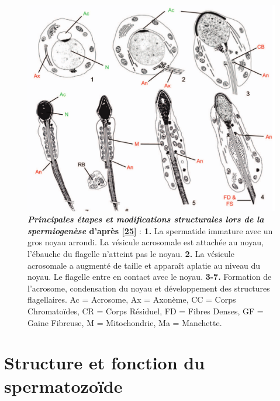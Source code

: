 \documentclass[12pt,a4paper,twoside]{ugathesis}
\theoremstyle{definition}
\theoremstyle{definition}
\theoremstyle{definition}
\theoremstyle{remark}
\begin{document}
\begin{figure}

{\centering \includegraphics[scale=0.3]{figure/spermiogenese} 

}

\caption[Principales étapes et modifications structurales lors de la spermiogenèse]{\textbf{\emph{Principales étapes et modifications
structurales lors de la spermiogenèse} d'après
{[}\protect\hyperlink{ref-Toure2011}{25}{]}} : \textbf{1.} La spermatide
immature avec un gros noyau arrondi. La vésicule acrosomale est attachée
au noyau, l'ébauche du flagelle n'atteint pas le noyau. \textbf{2.} La
vésicule acrosomale a augmenté de taille et apparaît aplatie au niveau
du noyau. Le flagelle entre en contact avec le noyau. \textbf{3-7.}
Formation de l'acrosome, condensation du noyau et développement des
structures flagellaires. Ac = Acrosome, Ax = Axonème, CC = Corps
Chromatoïdes, CR = Corps Résiduel, FD = Fibres Denses, GF = Gaine
Fibreuse, M = Mitochondrie, Ma = Manchette.}\label{fig:spermiogenese}
\end{figure}













\newpage  

\section{Structure et fonction du
spermatozoïde}\label{structure-et-fonction-du-spermatozoide}
\end{document}
